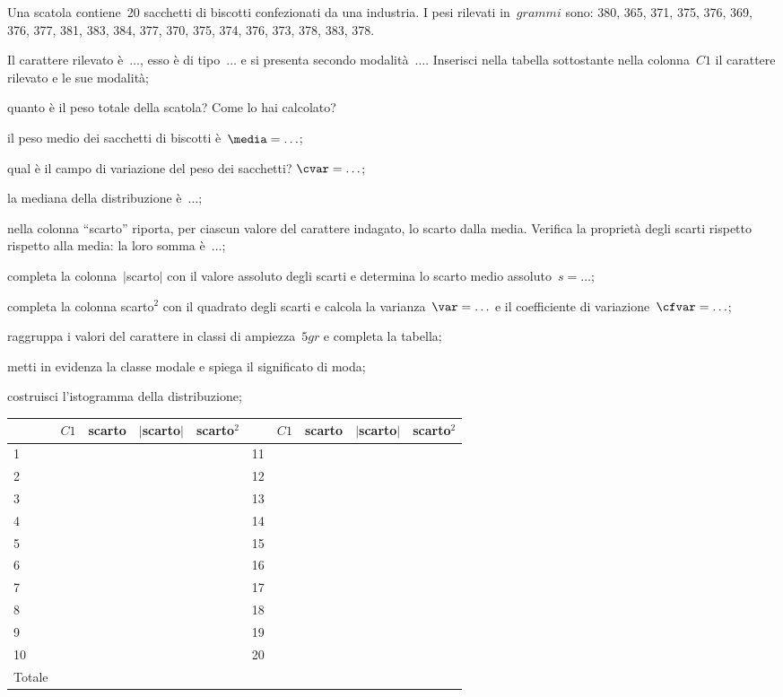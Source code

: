 \begin{esercizio}
\label{ese:A.46}
Una scatola contiene~20 sacchetti di biscotti confezionati da una industria. I pesi rilevati in~$\unit{grammi}$ sono:
380, 365, 371, 375, 376, 369, 376, 377, 381, 383, 384, 377, 370, 375, 374, 376, 373, 378, 383, 378.
\begin{enumeratea}
 \item Il carattere rilevato è~$\ldots$, esso è di tipo~$\ldots$ e si presenta secondo modalità~$\ldots$.
 Inserisci nella tabella sottostante nella colonna~$C1$ il carattere rilevato e le sue modalità;
 \item quanto è il peso totale della scatola? Come lo hai calcolato?
 \item il peso medio dei sacchetti di biscotti è~$\media = \ldots$;
 \item qual è il campo di variazione del peso dei sacchetti? $\cvar = \ldots$;
 \item la mediana della distribuzione è~$\ldots$;
 \item nella colonna ``scarto'' riporta, per ciascun valore del carattere indagato, lo scarto dalla media.
 Verifica la proprietà degli scarti rispetto rispetto alla media: la loro somma è~$\ldots$;
 \item completa la colonna~$\vert$scarto$\vert$ con il valore assoluto degli scarti e determina lo scarto medio assoluto~$s = \dots$;
 \item completa la colonna scarto$^2$ con il quadrato degli scarti e calcola la varianza~$\var = \ldots$ e
 il coefficiente di variazione~$\cfvar = \ldots$;
 \item raggruppa i valori del carattere in classi di ampiezza~$5 \unit{gr}$ e completa la tabella;
 \item metti in evidenza la classe modale e spiega il significato di moda;
 \item costruisci l'istogramma della distribuzione;

\begin{center}
\begin{tabular}{*{2}{lcccc}}
\toprule
 & $C1$ & scarto &$\vert$scarto$\vert$ &scarto$^2$& & $C1$ & scarto &$\vert$scarto$\vert$ &scarto$^2$\\
\midrule
1 & & & & &11 & & & &\\
2 & & & & &12 & & & &\\
3 & & & & &13 & & & &\\
4 & & & & &14 & & & &\\
5 & & & & &15 & & & &\\
6 & & & & &16 & & & &\\
7 & & & & &17 & & & &\\
8 & & & & &18 & & & &\\
9 & & & & &19 & & & &\\
10 & & & & &20 & & & &\\
\midrule
Totale & & & &&&&\\
\bottomrule
\end{tabular}
\end{center}


\end{enumeratea}
\end{esercizio}
